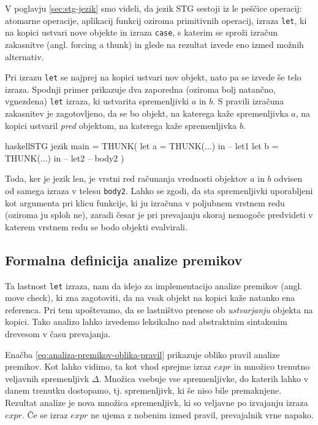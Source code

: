 V poglavju \ref{sec:stg-jezik} smo videli, da jezik STG sestoji iz le peščice operacij: atomarne operacije, aplikacij funkcij oziroma primitivnih operacij, izraza \texttt{let}, ki na kopici ustvari nove objekte in izraza \texttt{case}, s katerim se sproži izračun zakasnitve (angl. forcing a thunk) in glede na rezultat izvede eno izmed možnih alternativ.

Pri izrazu \texttt{let} se najprej na kopici ustvari nov objekt, nato pa se izvede še telo izraza. Spodnji primer prikazuje dva zaporedna (oziroma bolj natančno, vgnezdena) \texttt{let} izraza, ki ustvarita spremenljivki $a$ in $b$. S pravili izračuna zakasnitev je zagotovljeno, da se bo objekt, na katerega kaže spremenljivka $a$, na kopici ustvaril \emph{pred} objektom, na katerega kaže spremenljivka $b$.

\begin{code-box}{haskell}{STG jezik \cmark}
main = THUNK(
    let a = THUNK(...) in -- let1
    let b = THUNK(...) in -- let2
        -- body2
)
\end{code-box}

Toda, ker je jezik len, je vrstni red računanja vrednosti objektov $a$ in $b$ odvisen od samega izraza v telesu \texttt{body2}. Lahko se zgodi, da sta spremenljivki uporabljeni kot argumenta pri klicu funkcije, ki ju izračuna v poljubnem vrstnem redu (oziroma ju sploh ne), zaradi česar je pri prevajanju skoraj nemogoče predvideti v katerem vrstnem redu se bodo objekti evalvirali.

\subsection{Formalna definicija analize premikov}
Ta lastnost \texttt{let} izraza, nam da idejo za implementacijo analize premikov (angl. move check), ki zna zagotoviti, da na vsak objekt na kopici kaže natanko ena referenca. Pri tem upoštevamo, da se las\-tni\-štvo prenese ob \textit{ustvarjanju} objekta na kopici. Tako analizo lahko izvedemo leksikalno nad abstraktnim sintaksnim drevesom v času prevajanja.

Enačba \ref{eq:analiza-premikov-oblika-pravil} prikazuje obliko pravil analize premikov. Kot lahko vidimo, ta kot vhod sprejme izraz $expr$ in množico trenutno veljavnih spremenljivk $\Delta$. Množica vsebuje vse spremenljivke, do katerih lahko v danem trenutku dostopamo, tj. spremenljivk, ki še niso bile premaknjene. Rezultat analize je nova množica spremenljivk, ki so veljavne po izvajanju izraza $expr$. Če se izraz $expr$ ne ujema z nobenim izmed pravil, prevajalnik vrne napako.

